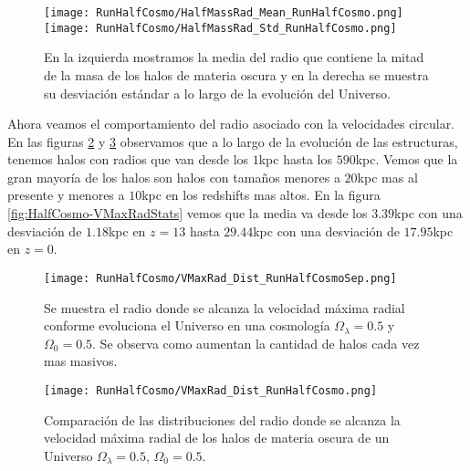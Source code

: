 \begin{figure}[H]
    \centering
    \texttt{[image: RunHalfCosmo/HalfMassRad\_Mean\_RunHalfCosmo.png]}
    \texttt{[image: RunHalfCosmo/HalfMassRad\_Std\_RunHalfCosmo.png]}
    \caption[Media y desviación estándar del radio de la mitad de la masa de un Universo $\Omega_\lambda = 0.5 $, $\Omega_0 = 0.5$]{\footnotesize En la izquierda mostramos la media del radio que contiene la mitad de la masa de los halos de materia oscura y en la derecha se muestra su desviación estándar a lo largo de la evolución del Universo.}
    \label{fig:HalfCosmo-HalfMassRadStats}
\end{figure}

Ahora veamos el comportamiento del radio asociado con la velocidades circular. En las figuras \ref{fig:HalfCosmo-VMaxRadDistSep} y \ref{fig:HalfCosmo-VMaxRadDist} observamos que a lo largo de la evolución de las estructuras, tenemos halos con radios que van desde los $1$kpc hasta los $590$kpc. Vemos que la gran mayoría de los halos son halos con tamaños menores a $20$kpc mas al presente y menores a $10$kpc en los redshifts mas altos. En la figura \ref{fig:HalfCosmo-VMaxRadStats} vemos que la media va desde los $3.39$kpc con una desviación de $1.18$kpc en $z=13$ hasta $29.44$kpc con una desviación de $17.95$kpc en $z=0$.

\begin{figure}[H]
    \centering
    \texttt{[image: RunHalfCosmo/VMaxRad\_Dist\_RunHalfCosmoSep.png]}
    \caption[Radio donde se alcanza la velocidad máxima radial en la evolución de un Universo $\Omega_\lambda = 0.5$, $\Omega_0 = 0.5$]{\footnotesize Se muestra el radio donde se alcanza la velocidad máxima radial conforme evoluciona el Universo en una cosmología $\Omega_\lambda = 0.5$ y $\Omega_0 = 0.5$. Se observa como aumentan la cantidad de halos cada vez mas masivos.}
    \label{fig:HalfCosmo-VMaxRadDistSep}
\end{figure}

\begin{figure}[H]
    \centering
    \texttt{[image: RunHalfCosmo/VMaxRad\_Dist\_RunHalfCosmo.png]}
    \caption[Distribución del radio donde se alcanza la velocidad máxima radial de un Universo $\Omega_\lambda = 0.5$, $\Omega_0 = 0.5$]{\footnotesize Comparación de las distribuciones del radio donde se alcanza la velocidad máxima radial de los halos de materia oscura de un Universo $\Omega_\lambda = 0.5$, $\Omega_0 = 0.5$.}
    \label{fig:HalfCosmo-VMaxRadDist}
\end{figure}

